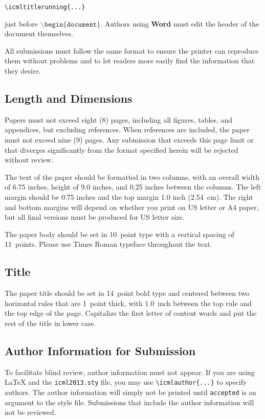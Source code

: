 \documentclass{article}
\begin{document}
\verb|\icmltitlerunning{...}|

just before $\mathtt{\backslash begin\{document\}}$.
Authors using \textbf{Word} must edit the header of the document themselves.
 
All submissions must follow the same format to ensure the printer can
reproduce them without problems and to let readers more easily find
the information that they desire.

\subsection{Length and Dimensions}

Papers must not exceed eight (8) pages, including all figures, tables,
and appendices, but excluding references. When references are included,
the paper must not exceed nine (9) pages. Any submission that exceeds 
this page limit or that diverges significantly from the format specified 
herein will be rejected without review.

The text of the paper should be formatted in two columns, with an
overall width of 6.75 inches, height of 9.0 inches, and 0.25 inches
between the columns. The left margin should be 0.75 inches and the top
margin 1.0 inch (2.54~cm). The right and bottom margins will depend on
whether you print on US letter or A4 paper, but all final versions
must be produced for US letter size.

The paper body should be set in 10~point type with a vertical spacing
of 11~points. Please use Times Roman typeface throughout the text.

\subsection{Title}

The paper title should be set in 14~point bold type and centered
between two horizontal rules that are 1~point thick, with 1.0~inch
between the top rule and the top edge of the page. Capitalize the
first letter of content words and put the rest of the title in lower
case.

\subsection{Author Information for Submission}
\label{author info}

To facilitate blind review, author information must not appear.  If
you are using \LaTeX\/ and the \texttt{icml2013.sty} file, you may use
\verb+\icmlauthor{...}+ to specify authors.  The author information
will simply not be printed until {\tt accepted} is an argument to the
style file. Submissions that include the author information will not
be reviewed.
\end{document}
